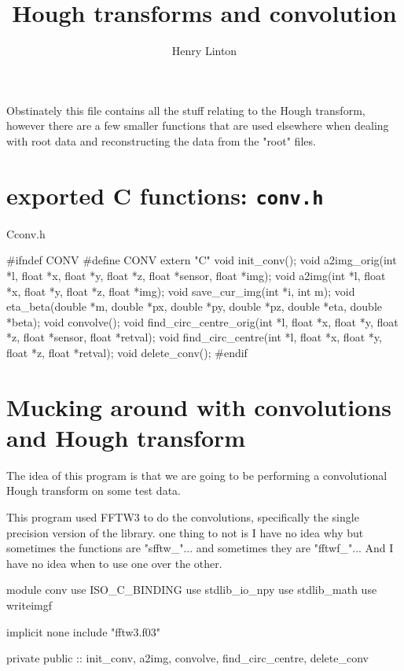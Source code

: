 \documentclass[10pt, a4paper]{article}
\title{Hough transforms and convolution}
\author{Henry Linton}
\begin{document}
\maketitle

Obstinately this file contains all the stuff relating to the Hough transform, however there are a few smaller functions that are used elsewhere when dealing with root data and reconstructing the data from the "root" files.

\section{exported C functions: \texttt{conv.h}}
\begin{subfile}{C}{conv.h}
\begin{code}
#ifndef CONV 
#define CONV
extern "C" {
	void init_conv();
	void a2img_orig(int *l,
	                float *x, float *y,  float *z,
	                float *sensor, float *img);
	void a2img(int *l,
	           float *x, float *y,  float *z,
	           float *img);
	void save_cur_img(int *i, int m);
	void eta_beta(double *m, double *px, double *py, double *pz,
	              double *eta, double *beta);
	void convolve();
	void find_circ_centre_orig(int *l,
	                           float *x, float *y, float *z,
	                           float *sensor, float *retval);
	void find_circ_centre(int *l,
	                      float *x, float *y, float *z,
	                      float *retval);
	void delete_conv();
}
#endif 
\end{code}
\end{subfile}

\section{Mucking around with convolutions and Hough transform}

The idea of this program is that we are going to be performing a convolutional Hough transform on some test data.

This program used FFTW3 to do the convolutions, specifically the single precision version of the library. 
one thing to not is I have no idea why but sometimes the functions are "sfftw_"... and sometimes they are "fftwf_"... And I have no idea when to use one over the other.

\begin{code}
module conv
	use ISO_C_BINDING
	use stdlib_io_npy 
	use stdlib_math 
	use writeimgf
	
	implicit none 
	include "fftw3.f03"
	
	private 
	public :: init_conv, a2img, convolve, find_circ_centre, delete_conv
\end{code}
\end{document}
